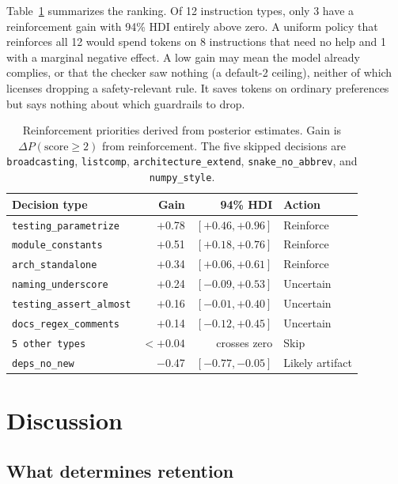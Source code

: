 \documentclass[a4paper]{llncs}
\begin{document}
Table~\ref{tab:policy} summarizes the ranking. Of 12 instruction types,
only 3 have a reinforcement gain with 94\% HDI entirely above zero. A
uniform policy that reinforces all 12 would spend tokens on 8
instructions that need no help and 1 with a marginal negative
effect. A low gain may
mean the model already complies, or that the checker saw nothing (a
default-2 ceiling), neither of which licenses dropping a safety-relevant
rule. It saves tokens on ordinary preferences but says nothing about which
guardrails to drop.

\begin{table}[t]
\caption{Reinforcement priorities derived from posterior
estimates. Gain is $\Delta P(\text{score} \geq 2)$ from reinforcement.
The five skipped decisions are \texttt{broadcasting},
\texttt{listcomp}, \texttt{architecture\_extend},
\texttt{snake\_no\_abbrev}, and \texttt{numpy\_style}.}\label{tab:policy}
\centering
\begin{tabular}{lrrl}
\toprule
Decision type & Gain & 94\% HDI & Action \\
\midrule
\texttt{testing\_parametrize}    & $+$0.78 & $[+0.46, +0.96]$ & Reinforce \\
\texttt{module\_constants}       & $+$0.51 & $[+0.18, +0.76]$ & Reinforce \\
\texttt{arch\_standalone}        & $+$0.34 & $[+0.06, +0.61]$ & Reinforce \\
\texttt{naming\_underscore}      & $+$0.24 & $[-0.09, +0.53]$ & Uncertain \\
\texttt{testing\_assert\_almost} & $+$0.16 & $[-0.01, +0.40]$ & Uncertain \\
\texttt{docs\_regex\_comments}   & $+$0.14 & $[-0.12, +0.45]$ & Uncertain \\
\texttt{5 other types}           & $< +0.04$ & crosses zero & Skip \\
\texttt{deps\_no\_new}           & $-$0.47 & $[-0.77, -0.05]$ & Likely artifact \\
\bottomrule
\end{tabular}
\end{table}


\section{Discussion}
\label{sec:discussion}

\subsection{What determines retention}
\end{document}
